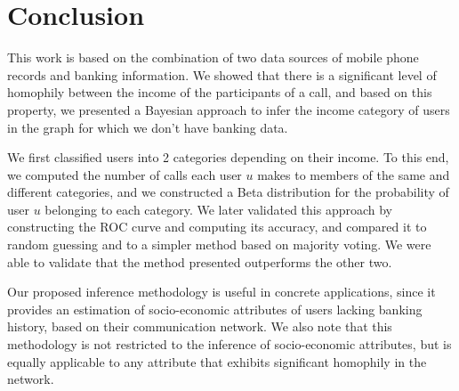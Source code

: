 \section{Conclusion}

This work is based on the combination of two data sources of mobile phone records and banking information. We showed that there is a significant level of homophily between the income of the participants of a call, and based on this property, we presented a Bayesian approach to infer the income category of users in the graph for which we don't have banking data.

We first classified users into 2 categories depending on their income. To this end, we computed the number of calls each user \( u \) makes to members of the same and different categories, and we constructed a Beta distribution for the probability of user \( u \) belonging to each category. We later validated this approach by constructing the ROC curve and computing its accuracy, and compared it to random guessing and to a simpler method based on majority voting. We were able to validate that the method presented outperforms the other two.

Our proposed inference methodology is useful in concrete applications, since it provides an estimation of socio-economic attributes of users lacking banking history, based on their communication network. We also note that this methodology is not restricted to the inference of socio-economic attributes, but is equally applicable to any attribute that exhibits significant homophily in the network.

%
%
%
%
%
%
